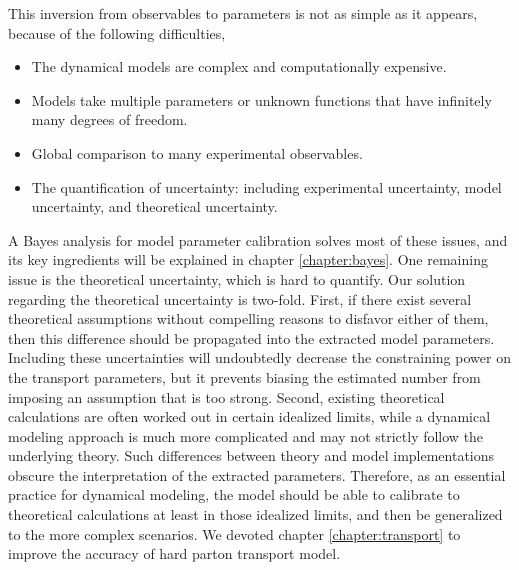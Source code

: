 This inversion from observables to parameters is not as simple as it appears, because of the following difficulties,
\begin{itemize}
\item The dynamical models are complex and computationally expensive.
\item Models take multiple parameters or unknown functions that have infinitely many degrees of freedom.
\item Global comparison to many experimental observables.
\item The quantification of uncertainty: including experimental uncertainty, model uncertainty, and theoretical uncertainty.
\end{itemize}
A Bayes analysis for model parameter calibration solves most of these issues, and its key ingredients will be explained in chapter \ref{chapter:bayes}.
One remaining issue is the theoretical uncertainty, which is hard to quantify.
Our solution regarding the theoretical uncertainty is two-fold.
First, if there exist several theoretical assumptions without compelling reasons to disfavor either of them, then this difference should be propagated into the extracted model parameters.
Including these uncertainties will undoubtedly decrease the constraining power on the transport parameters, but it prevents biasing the estimated number from imposing an assumption that is too strong.
Second, existing theoretical calculations are often worked out in certain idealized limits, while a dynamical modeling approach is much more complicated and may not strictly follow the underlying theory.
Such differences between theory and model implementations obscure the interpretation of the extracted parameters.
Therefore, as an essential practice for dynamical modeling, the model should be able to calibrate to theoretical calculations at least in those idealized limits, and then be generalized to the more complex scenarios.
We devoted chapter \ref{chapter:transport} to improve the accuracy of hard parton transport model.

